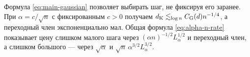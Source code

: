 Формула \eqref{eq:main-gaussian} позволяет выбирать шаг, не фиксируя его
заранее. При $\alpha=c/\sqrt n$ с фиксированным $c>0$ получаем
$d_{\mathrm K}\lesssim_{\log{n}}C_{\rm G}(d)n^{-1/4}$, а переходный член
экспоненциально мал. Общая формула \eqref{eq:alpha-n-rate} показывает цену
слишком малого шага через $(\alpha n)^{-1/2}L_\alpha^{1/2}$ и переходный
член, а слишком большого --- через $\sqrt\alpha$ и
$\sqrt n\,\alpha^{3/2}L_\alpha^{3/2}$.
